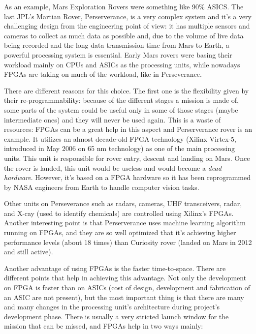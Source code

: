 As an example, Mars Exploration Rovers were something like 90\% ASICS. The last JPL's Martian Rover, Perserverance, is a very complex system and it's a very challenging design from the engineering point of view: it has multiple sensors and cameras to collect as much data as possible and, due to the volume of live data being recorded and the long data transmission time from Mars to Earth, a powerful processing system is essential. Early Mars rovers were basing their workload mainly on CPUs and ASICs as the processing units, while nowadays FPGAs are taking on much of the workload, like in Perseverance.\bigskip

There are different reasons for this choice. The first one is the flexibility given by their re-programmability: because of the different stages a mission is made of, some parts of the system could be useful only in some of those stages (maybe intermediate ones) and they will never be used again. This is a waste of resources: FPGAs can be a great help in this aspect and Perserverance rover is an example. It utilizes an almost decade-old FPGA technology (Xilinx Virtex-5, introduced in May 2006 on 65 nm technology) as one of the main processing units. This unit is responsible for rover entry, descent and landing on Mars. Once the rover is landed, this unit would be useless and would become a \textit{dead hardware}. However, it's based on a FPGA hardware so it has been reprogrammed by NASA engineers from Earth to handle computer vision tasks.\bigskip

Other units on Perseverance such as radars, cameras, UHF transceivers, radar, and X-ray (used to identify chemicals) are controlled using Xilinx's FPGAs. Another interesting point is that Perserverance uses machine learning algorithm running on FPGAs, and they are so well optimized that it's achieving higher performance levels (about 18 times) than Curiosity rover (landed on Mars in 2012 and still active). \bigskip

Another advantage of using FPGAs is the faster time-to-space. There are different points that help in achieving this advantage. Not only the development on FPGA is faster than on ASICs (cost of design, development and fabrication of an ASIC are not present), but the most important thing is that there are many and many changes in the processing unit's architecture during project's development phase. There is usually a very stricted launch window for the mission that can be missed, and FPGAs help in two ways mainly:

